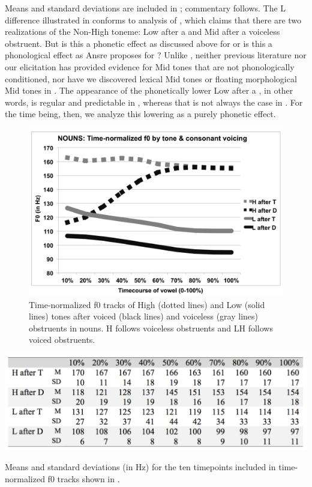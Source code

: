 \documentclass[output=paper
,newtxmath
,modfonts
,nonflat]{langsci/langscibook}
\begin{document}
Means and standard deviations are included in ; commentary follows. The L  difference illustrated in  conforms to  analysis of , which claims that there are two realizations of the Non-High toneme: Low after a  and Mid after a voiceless obstruent. But is this a phonetic effect as discussed above for  \citep{Oglesbee2008} or is this a phonological effect as Ansre proposes for ? Unlike , neither previous  literature nor our elicitation has provided evidence for Mid tones that are not phonologically conditioned, nor have we discovered lexical Mid tones or floating morphological Mid tones in . The appearance of the phonetically lower Low after a , in other words, is regular and predictable in , whereas that is not always the case in . For the time being, then, we analyze this  lowering as a purely phonetic effect.


\begin{figure}
	\includegraphics[width=\textwidth]{figures/fig-lotven-4.png}
	\caption{\label{fig:lotven:4} Time-normalized f0 tracks of High (dotted lines) and Low (solid lines) tones after voiced (black lines) and voiceless (gray lines) obstruents in nouns. H follows voiceless obstruents and LH follows voiced obstruents.}
\end{figure}


\begin{table} 
	\includegraphics[width=\textwidth]{figures/tab-lotven-2.png}
	\caption{Means and standard deviations (in Hz) for the ten timepoints included in time-normalized f0 tracks shown in .}
	\label{tab:lotven:2}
\end{table}
\end{document}
